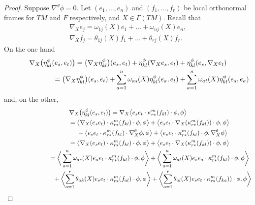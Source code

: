 \documentclass[pdftex]{sigma}
\numberwithin{equation}{section}
\begin{document}
\begin{proof}\allowdisplaybreaks Suppose $\nabla^\theta \phi=0$. Let $(e_1,\dots,e_n)$ and $(f_1,\dots,f_r)$ be local orthonormal frames for $TM$ and $F$ respectively,
and $X\in\Gamma(TM)$. Recall that
\begin{gather*}
\nabla_Xe_j = \omega_{1j}(X) e_1 +\dots +\omega_{nj}(X) e_n ,\\
\nabla_Xf_j = \theta_{1j}(X) f_1 +\dots +\theta_{rj}(X) f_r.
\end{gather*}
On the one hand
\begin{gather*}
 \nabla_X \big(\eta_{kl}^\phi(e_s,e_t)\big) = \big(\nabla_X \eta_{kl}^\phi\big)(e_s,e_t) + \eta_{kl}^\phi(\nabla_Xe_s,e_t)+\eta_{kl}^\phi(e_s,\nabla_Xe_t)\\
\hphantom{\nabla_X \big(\eta_{kl}^\phi(e_s,e_t)\big)}{} = \big(\nabla_X \eta_{kl}^\phi\big)(e_s,e_t) +
\sum_{a=1}^n\omega_{as}(X)\eta_{kl}^\phi(e_a,e_t)+\sum_{a=1}^n\omega_{at}(X)\eta_{kl}^\phi(e_s,e_a)
\end{gather*}
and, on the other,
\begin{gather*}
 \nabla_X \big(\eta_{kl}^\phi(e_s,e_t)\big) = \nabla_X \big\langle e_s e_t\cdot \kappa_{r*}^m(f_{kl}) \cdot \phi,\phi \big\rangle \\
\hphantom{\nabla_X \big(\eta_{kl}^\phi(e_s,e_t)\big)}{}
 = \big\langle \nabla_X (e_s e_t)\cdot \kappa_{r*}^m(f_{kl}) \cdot \phi,\phi \big\rangle
+\big\langle e_s e_t\cdot \nabla_X (\kappa_{r*}^m(f_{kl})) \cdot \phi,\phi \big\rangle \\
\hphantom{\nabla_X \big(\eta_{kl}^\phi(e_s,e_t)\big)=}{}
 +\big\langle e_s e_t\cdot \kappa_{r*}^m(f_{kl}) \cdot \nabla_X^\theta \phi,\phi \big\rangle
+\big\langle e_s e_t\cdot \kappa_{r*}^m(f_{kl}) \cdot \phi,\nabla_X^\theta\phi \big\rangle \\
\hphantom{\nabla_X \big(\eta_{kl}^\phi(e_s,e_t)\big)}{}
 = \big\langle \nabla_X (e_s e_t)\cdot \kappa_{r*}^m(f_{kl}) \cdot \phi,\phi \big\rangle
+\big\langle e_s e_t\cdot \nabla_X (\kappa_{r*}^m(f_{kl})) \cdot \phi,\phi \big\rangle \\
\hphantom{\nabla_X \big(\eta_{kl}^\phi(e_s,e_t)\big)}{}
 = \bigg\langle \sum_{a=1}^n\omega_{as}(X)e_a e_t\cdot \kappa_{r*}^m(f_{kl}) \cdot \phi,\phi \bigg\rangle
+\bigg\langle \sum_{a=1}^n\omega_{at}(X)e_s e_a\cdot \kappa_{r*}^m(f_{kl}) \cdot \phi,\phi \bigg\rangle \\
\hphantom{\nabla_X \big(\eta_{kl}^\phi(e_s,e_t)\big)=}{}
 +\bigg\langle\! \sum_{a=1}^r\theta_{ak}(X)e_s e_t\cdot \kappa_{r*}^m(f_{al}) \cdot \phi,\phi \bigg\rangle
+\bigg\langle\! \sum_{a=1}^r\theta_{al}(X)e_s e_t\cdot \kappa_{r*}^m(f_{ka})) \cdot \phi,\phi \bigg\rangle \\

\end{gather*}
\end{proof}
\end{document}
